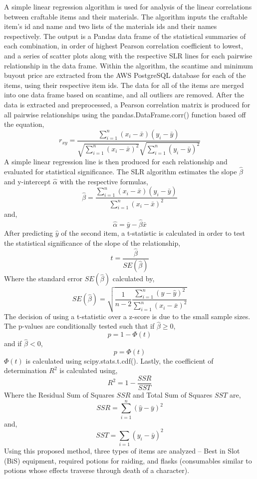 \documentclass[sigconf]{acmart}
\begin{document}
A simple linear regression algorithm is used for analysis of the linear correlations between craftable items and their materials. The algorithm inputs the craftable item’s id and name and two lists of the materials ids and their names respectively. The output is a Pandas data frame of the statistical summaries of each combination, in order of highest Pearson correlation coefficient to lowest, and a series of scatter plots along with the respective SLR lines for each pairwise relationship in the data frame. Within the algorithm, the scantime and minimum buyout price are extracted from the AWS PostgreSQL database for each of the items, using their respective item ids. The data for all of the items are merged into one data frame based on scantime, and all outliers are removed. After the data is extracted and preprocessed, a Pearson correlation matrix is produced for all pairwise relationships using the pandas.DataFrame.corr() function based off the equation,
\[ r_{xy} = \frac{\sum_{i=1}^n (x_i - \bar{x})(y_i - \bar{y})}{\sqrt{\sum_{i=1}^n(x_i - \bar{x})^2} \sqrt{\sum_{i=1}^n(y_i - \bar{y})^2}} \]
A simple linear regression line is then produced for each relationship and evaluated for statistical significance. The SLR algorithm estimates the slope \( \hat{\beta} \) and y-intercept \( \hat{\alpha} \) with the respective formulas,
\[ \hat{\beta} = \frac{\sum_{i=1}^n(x_i - \bar{x})(y_i - \bar{y})}{\sum_{i=1}^n (x_i - \bar{x})^2} \]
and,
\[ \hat{\alpha} = \bar{y} - \hat{\beta}\bar{x} \]
After predicting \( \hat{y} \) of the second item, a t-statistic is calculated in order to test the statistical significance of the slope of the relationship,
\[ t = \frac{\hat{\beta}}{SE(\hat{\beta})} \]
Where the standard error \( SE(\hat{\beta}) \) calculated by,
\[ SE(\hat{\beta}) = \sqrt{\frac{1}{n - 2} \frac{\sum_{i=1}^n (y - \hat{y})^2}{\sum_{i=1}^n (x_i - \bar{x})^2}} \]
The decision of using a t-statistic over a z-score is due to the small sample sizes. The p-values are conditionally tested such that if \( \hat{\beta} \geq 0 \),
\[ p = 1 -\Phi(t) \]
and if \( \hat{\beta} < 0 \),
\[ p = \Phi(t) \]
\( \Phi(t) \) is calculated using scipy.stats.t.cdf(). Lastly, the coefficient of determination \( R^2 \) is calculated using, 
\[ R^2 = 1 - \frac{SSR}{SST} \]
Where the Residual Sum of Squares \( SSR \) and Total Sum of Squares \( SST \) are,
\[ SSR = \sum_{i=1}^n (\hat{y} - \bar{y})^2 \]
and,
\[ SST = \sum_{i=1} (y_i - \bar{y})^2 \]
Using this proposed method, three types of items are analyzed – Best in Slot (BiS) equipment, required potions for raiding, and flasks (consumables similar to potions whose effects traverse through death of a character).
\end{document}
